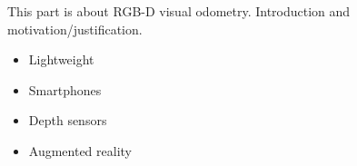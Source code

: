 This part is about RGB-D visual odometry.
Introduction and motivation/justification.

\begin{itemize}
	\item Lightweight
	\item Smartphones
	\item Depth sensors
	\item Augmented reality
\end{itemize}


% 


